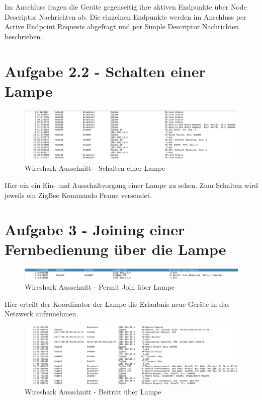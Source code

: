 Im Anschluss fragen die Geräte gegenseitig ihre aktiven Endpunkte über \grqq Node Descriptor\grqq{} Nachrichten ab. Die einzelnen Endpunkte werden im Anschluss per \grqq 
Active Endpoint Requests\grqq{} abgefragt und per \grqq Simple Descriptor\grqq{} Nachrichten beschrieben.

\section{Aufgabe 2.2 - Schalten einer Lampe}

\begin{figure}[H]
    \centering
    \includegraphics[width=1\textwidth]{media/lsg2.2.png}
    \caption{Wireshark Ausschnitt - Schalten einer Lampe}
\end{figure}

Hier ein ein Ein- und Ausschaltvorgang einer Lampe zu sehen. Zum Schalten wird jeweils ein \grqq ZigBee Kommando Frame\grqq{} versendet.

\section{Aufgabe 3 - Joining einer Fernbedienung über die Lampe}

\begin{figure}[H]
    \centering
    \includegraphics[width=1\textwidth]{media/lsg-3-1.png}
    \caption{Wireshark Ausschnitt - Permit Join über Lampe}
\end{figure}

Hier erteilt der Koordinator der Lampe die Erlaubnis neue Geräte in das Netzwerk aufzunehmen.

\begin{figure}[H]
    \centering
    \includegraphics[width=1\textwidth]{media/lsg-3-2.png}
    \caption{Wireshark Ausschnitt - Beitritt über Lampe}
\end{figure}

